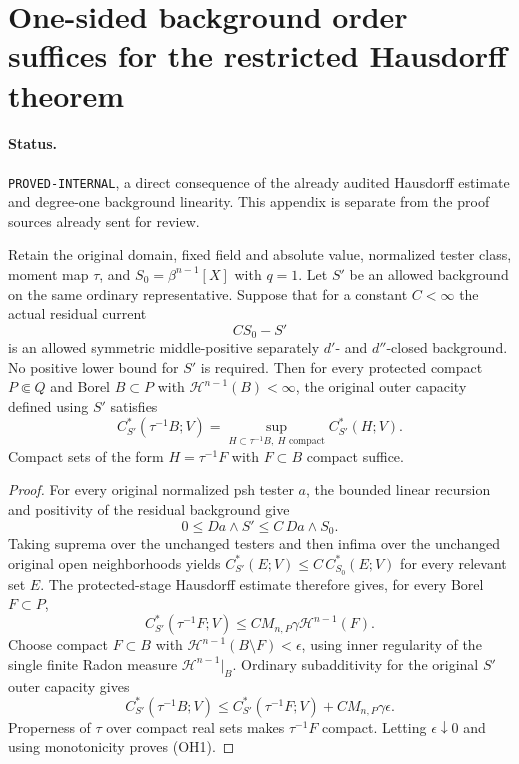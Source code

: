 \section{One-sided background order suffices for the restricted Hausdorff theorem}
\paragraph{Status.}
\texttt{PROVED-INTERNAL}, a direct consequence of the already audited
Hausdorff estimate and degree-one background linearity. This appendix
is separate from the proof sources already sent for review.

Retain the original domain, fixed field and absolute value, normalized
tester class, moment map $\tau$, and $S_0=\beta^{n-1}[X]$ with $q=1$.
Let $S'$ be an allowed background on the same ordinary representative.
Suppose that for a constant $C<\infty$ the actual residual current
\[
                       CS_0-S'
\]
is an allowed symmetric middle-positive separately $d'$- and
$d''$-closed background. No positive lower bound for $S'$ is required.
Then for every protected compact $P\Subset Q$ and Borel $B\subset P$
with $\mathcal H^{n-1}(B)<\infty$, the original outer capacity defined
using $S'$ satisfies
\[
 C_{S'}^*(\tau^{-1}B;V)
   =\sup_{H\subset\tau^{-1}B,\ H\text{ compact}}C_{S'}^*(H;V).
 \tag{OH1}
\]
Compact sets of the form $H=\tau^{-1}F$ with $F\subset B$ compact suffice.

\begin{proof}
For every original normalized psh tester $a$, the bounded linear
recursion and positivity of the residual background give
\[
 0\le Da\wedge S'\le C\,Da\wedge S_0.
\]
Taking suprema over the unchanged testers and then infima over the
unchanged original open neighborhoods yields
$C_{S'}^*(E;V)\le C\,C_{S_0}^*(E;V)$ for every relevant set $E$.
The protected-stage Hausdorff estimate therefore gives, for every
Borel $F\subset P$,
\[
 C_{S'}^*(\tau^{-1}F;V)
       \le C M_{n,P}\gamma\mathcal H^{n-1}(F).
\]
Choose compact $F\subset B$ with
$\mathcal H^{n-1}(B\setminus F)<\epsilon$, using inner regularity of
the single finite Radon measure $\mathcal H^{n-1}|_B$. Ordinary
subadditivity for the original $S'$ outer capacity gives
\[
 C_{S'}^*(\tau^{-1}B;V)
 \le C_{S'}^*(\tau^{-1}F;V)+C M_{n,P}\gamma\epsilon.
\]
Properness of $\tau$ over compact real sets makes $\tau^{-1}F$ compact.
Letting $\epsilon\downarrow0$ and using monotonicity proves (OH1).
\end{proof}

